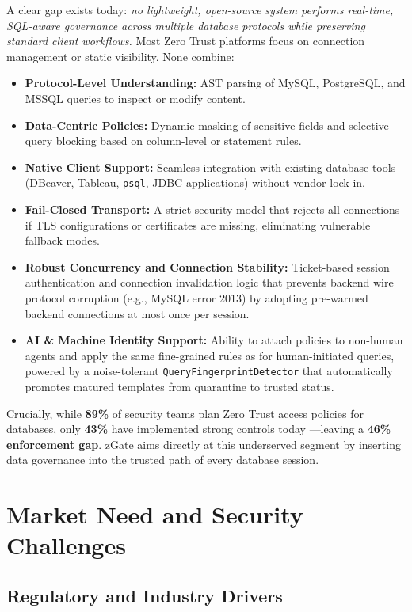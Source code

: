 A clear gap exists today: \emph{no lightweight, open-source system performs real-time, SQL-aware governance across multiple database protocols while preserving standard client workflows.} Most Zero Trust platforms focus on connection management or static visibility. None combine:

\begin{itemize}
    \item \textbf{Protocol-Level Understanding:} AST parsing of MySQL, PostgreSQL, and MSSQL queries to inspect or modify content.
    \item \textbf{Data-Centric Policies:} Dynamic masking of sensitive fields and selective query blocking based on column-level or statement rules.
    \item \textbf{Native Client Support:} Seamless integration with existing database tools (DBeaver, Tableau, \texttt{psql}, JDBC applications) without vendor lock-in.
    \item \textbf{Fail-Closed Transport:} A strict security model that rejects all connections if TLS configurations or certificates are missing, eliminating vulnerable fallback modes.
    \item \textbf{Robust Concurrency and Connection Stability:} Ticket-based session authentication and connection invalidation logic that prevents backend wire protocol corruption (e.g., MySQL error 2013) by adopting pre-warmed backend connections at most once per session.
    \item \textbf{AI \& Machine Identity Support:} Ability to attach policies to non-human agents and apply the same fine-grained rules as for human-initiated queries, powered by a noise-tolerant \texttt{QueryFingerprintDetector} that automatically promotes matured templates from quarantine to trusted status.
\end{itemize}

Crucially, while \textbf{89\%} of security teams plan Zero Trust access policies for databases, only \textbf{43\%} have implemented strong controls today \cite{okta2023zt}---leaving a \textbf{46\% enforcement gap}. zGate aims directly at this underserved segment by inserting data governance into the trusted path of every database session.

\section{Market Need and Security Challenges}

\subsection{Regulatory and Industry Drivers}

